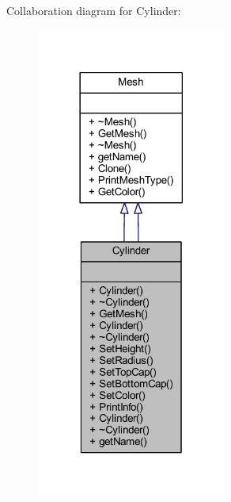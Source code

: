 Collaboration diagram for Cylinder\+:
\nopagebreak
\begin{figure}[H]
\begin{center}
\leavevmode
\includegraphics[width=177pt]{class_cylinder__coll__graph}
\end{center}
\end{figure}
